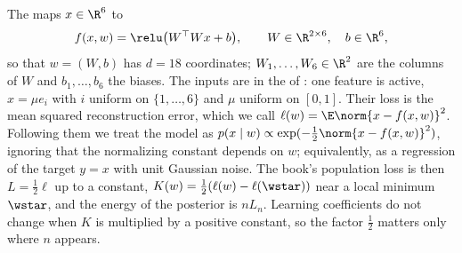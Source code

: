 \begin{refsection}
The  maps $x\in\R^6$ to
\[
f(x,w)=\relu\bigl(W^\top Wx+b\bigr),\qquad W\in\R^{2\times6},\quad b\in\R^6,
\]
so that $w=(W,b)$ has $d=18$ coordinates; $W_1,\dots,W_6\in\R^2$ are the columns of $W$ and $b_1,\dots,b_6$ the biases. The inputs are in the  of \textcite{ChenEtAl2023}: one feature is active, $x=\mu e_i$ with $i$ uniform on $\{1,\dots,6\}$ and $\mu$ uniform on $[0,1]$. Their loss is the mean squared reconstruction error, which we call $\ell(w)=\E\norm{x-f(x,w)}^2$. Following them we treat the model as $p(x\mid w)\propto\exp(-\frac12\norm{x-f(x,w)}^2)$, ignoring that the normalizing constant depends on $w$; equivalently, as a regression of the target $y=x$ with unit Gaussian noise. The book's population loss is then $L=\frac12\ell$ up to a constant, $K(w)=\frac12(\ell(w)-\ell(\wstar))$ near a local minimum $\wstar$, and the energy of the posterior is $nL_n$. Learning coefficients do not change when $K$ is multiplied by a positive constant, so the factor $\frac12$ matters only where $n$ appears.


\end{refsection}
